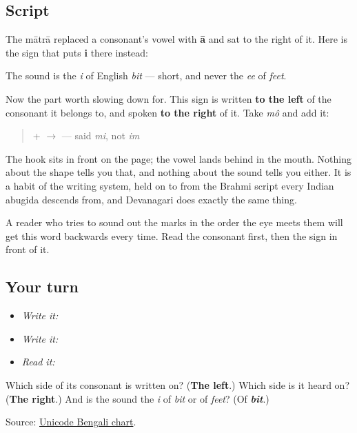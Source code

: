 \subsection*{Script}
The mātrā \textbf{} replaced a consonant's vowel with \textbf{ā} and sat to the right of it. Here is the sign that puts \textbf{i} there instead:

\begin{quote}
\end{quote}

The sound is the \emph{i} of English \emph{bit} — short, and never the \emph{ee} of \emph{feet}.

Now the part worth slowing down for. This sign is written \textbf{to the left} of the consonant it belongs to, and spoken \textbf{to the right} of it. Take \textbf{} \emph{mô} and add it:

\begin{quote}
\textbf{} + \textbf{} $\to$ \textbf{} — said \emph{mi}, not \emph{im}
\end{quote}

The hook sits in front on the page; the vowel lands behind in the mouth. Nothing about the shape tells you that, and nothing about the sound tells you either. It is a habit of the writing system, held on to from the Brahmi script every Indian abugida descends from, and Devanagari does exactly the same thing.

A reader who tries to sound out the marks in the order the eye meets them will get this word backwards every time. Read the consonant first, then the sign in front of it.

\subsection*{Your turn}
\begin{itemize}
\raggedright
  \item \emph{Write it:} 
  \item \emph{Write it:} 
  \item \emph{Read it:} 
\end{itemize}

\begin{tcolorbox}[breakable,colback=teal!4,colframe=teal!35!black,title={Before you move on}]
Which side of its consonant is \textbf{} written on? (\textbf{The left}.) Which side is it heard on? (\textbf{The right}.) And is the sound the \emph{i} of \emph{bit} or of \emph{feet}? (Of \emph{\textbf{bit}}.)

Source: \href{https://www.unicode.org/charts/PDF/U0980.pdf}{Unicode Bengali chart}.
\end{tcolorbox}
